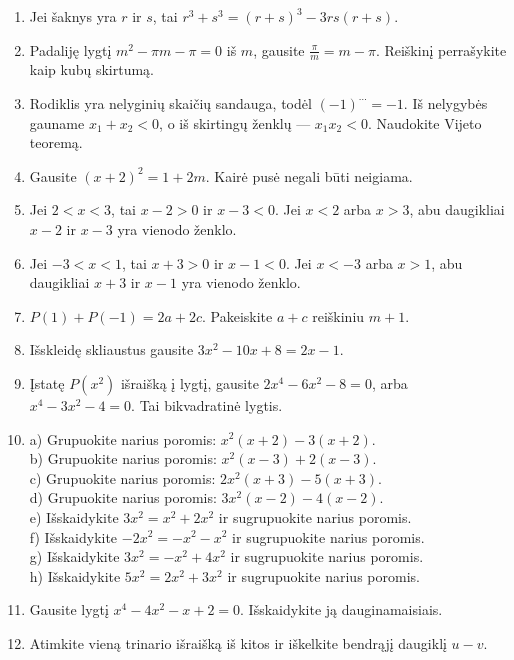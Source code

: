 \documentclass[11pt,a4paper]{scrartcl}
\begin{document}
\begin{enumerate}
    \item Jei šaknys yra $r$ ir $s$, tai
    $r^3+s^3=(r+s)^3-3rs(r+s)$.
    \item Padaliję lygtį $m^2-\pi m-\pi=0$ iš $m$, gausite
    $\frac{\pi}{m}=m-\pi$. Reiškinį perrašykite kaip kubų skirtumą.
    \item Rodiklis yra nelyginių skaičių sandauga, todėl
    $(-1)^{\cdots}=-1$. Iš nelygybės gauname $x_1+x_2<0$,
    o iš skirtingų ženklų — $x_1x_2<0$. Naudokite Vijeto teoremą.
    \item Gausite $(x+2)^2=1+2m$. Kairė pusė negali būti neigiama.
    \item Jei $2<x<3$, tai $x-2>0$ ir $x-3<0$. Jei $x<2$ arba
    $x>3$, abu daugikliai $x-2$ ir $x-3$ yra vienodo ženklo.
    \item Jei $-3<x<1$, tai $x+3>0$ ir $x-1<0$. Jei $x<-3$ arba
    $x>1$, abu daugikliai $x+3$ ir $x-1$ yra vienodo ženklo.
    \item $P(1)+P(-1)=2a+2c$. Pakeiskite $a+c$ reiškiniu $m+1$.
    \item Išskleidę skliaustus gausite
    $3x^2-10x+8=2x-1$.
    \item Įstatę $P(x^2)$ išraišką į lygtį, gausite
    $2x^4-6x^2-8=0$, arba $x^4-3x^2-4=0$. Tai bikvadratinė lygtis.
    \item a) Grupuokite narius poromis:
    $x^2(x+2)-3(x+2)$.\\
    b) Grupuokite narius poromis:
    $x^2(x-3)+2(x-3)$.\\
    c) Grupuokite narius poromis: 
    $2x^2(x+3)-5(x+3)$.\\
    d) Grupuokite narius poromis:
    $3x^2(x-2)-4(x-2)$.\\
    e) Išskaidykite $3x^2=x^2+2x^2$ ir sugrupuokite narius poromis.\\
    f) Išskaidykite $-2x^2=-x^2-x^2$ ir sugrupuokite narius poromis.\\
    g) Išskaidykite $3x^2=-x^2+4x^2$ ir sugrupuokite narius poromis.\\
    h) Išskaidykite $5x^2=2x^2+3x^2$ ir sugrupuokite narius poromis.\\
    \item Gausite lygtį $x^4-4x^2-x+2=0$. Išskaidykite ją
    dauginamaisiais.
    \item Atimkite vieną trinario išraišką iš kitos ir iškelkite
    bendrąjį daugiklį $u-v$.
\end{enumerate}
\end{document}
